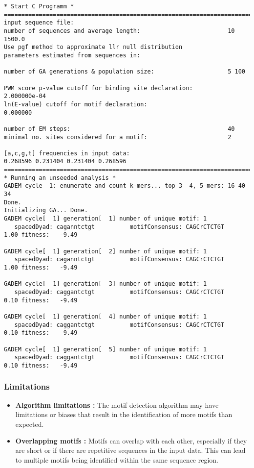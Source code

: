 \begin{lstlisting}
* Start C Programm *
========================================================================================
input sequence file:  
number of sequences and average length:                         10 1500.0
Use pgf method to approximate llr null distribution
parameters estimated from sequences in:  

number of GA generations & population size:                     5 100

PWM score p-value cutoff for binding site declaration:          2.000000e-04
ln(E-value) cutoff for motif declaration:                       0.000000

number of EM steps:                                             40
minimal no. sites considered for a motif:                       2

[a,c,g,t] frequencies in input data:                            0.268596 0.231404 0.231404 0.268596
========================================================================================
* Running an unseeded analysis *
GADEM cycle  1: enumerate and count k-mers... top 3  4, 5-mers: 16 40 34
Done.
Initializing GA... Done.
GADEM cycle[  1] generation[  1] number of unique motif: 1
   spacedDyad: caganntctgt          motifConsensus: CAGCrCTCTGT           1.00 fitness:   -9.49

GADEM cycle[  1] generation[  2] number of unique motif: 1
   spacedDyad: caganntctgt          motifConsensus: CAGCrCTCTGT           1.00 fitness:   -9.49

GADEM cycle[  1] generation[  3] number of unique motif: 1
   spacedDyad: caggantctgt          motifConsensus: CAGCrCTCTGT           0.10 fitness:   -9.49

GADEM cycle[  1] generation[  4] number of unique motif: 1
   spacedDyad: caggantctgt          motifConsensus: CAGCrCTCTGT           0.10 fitness:   -9.49

GADEM cycle[  1] generation[  5] number of unique motif: 1
   spacedDyad: caggantctgt          motifConsensus: CAGCrCTCTGT           0.10 fitness:   -9.49

\end{lstlisting}

\subsubsection{Limitations}

\begin{itemize}

    \item \textbf{Algorithm limitations :} The motif detection algorithm may have limitations or biases that result in the identification of more motifs than expected.

    \item \textbf{Overlapping motifs :} Motifs can overlap with each other, especially if they are short or if there are repetitive sequences in the input data. This can lead to multiple motifs being identified within the same sequence region.
    
\end{itemize}

